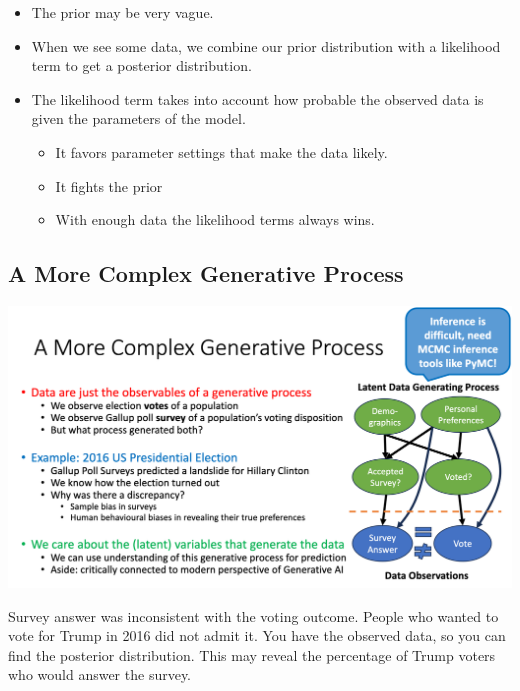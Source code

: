 \documentclass[11pt]{article}
\theoremstyle{definition}
\begin{document}
\begin{itemize}
    \item The prior may be very vague.
    \item When we see some data, we combine our prior distribution
    with a likelihood term to get a posterior distribution.
    \item The likelihood term takes into account how probable the
    observed data is given the parameters of the model.
    \begin{itemize}
        \item It favors parameter settings that make the data likely.
        \item It fights the prior
        \item With enough data the likelihood terms always wins.
    \end{itemize}
\end{itemize}

\subsection{A More Complex Generative Process}
\includegraphics[width=\textwidth/2]{12.png}

Survey answer was inconsistent with the voting outcome. People who 
wanted to vote for Trump in 2016 did not admit it. You have the observed data,
so you can find the posterior distribution. This may reveal the percentage
of Trump voters who would answer the survey.
\end{document}
